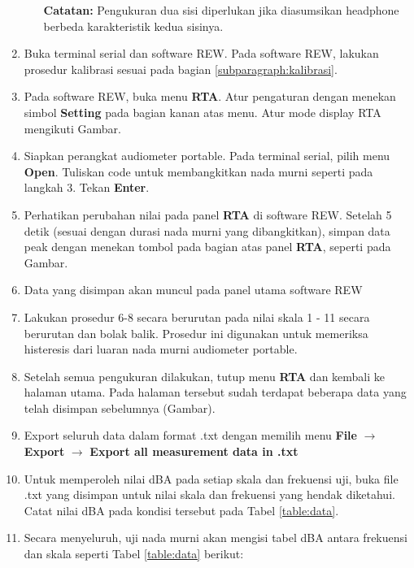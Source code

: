 \documentclass{article}
\begin{document}
\begin{enumerate}
\begin{itemize}
				\textbf{Catatan:} Pengukuran dua sisi diperlukan jika diasumsikan headphone berbeda karakteristik kedua sisinya.
			\end{itemize}

			\item Buka terminal serial dan software REW. Pada software REW, lakukan prosedur kalibrasi sesuai pada bagian \ref{subparagraph:kalibrasi}.

			\item Pada software REW, buka menu {\bf RTA}. Atur pengaturan dengan menekan simbol {\bf Setting} pada bagian kanan atas menu. Atur mode display RTA mengikuti Gambar.

			\item Siapkan perangkat audiometer portable. Pada terminal serial, pilih menu {\bf Open}. Tuliskan code untuk membangkitkan nada murni seperti pada langkah 3. Tekan {\bf Enter}.

			\item Perhatikan perubahan nilai pada panel {\bf RTA} di software REW. Setelah 5 detik (sesuai dengan durasi nada murni yang dibangkitkan), simpan data peak dengan menekan tombol pada bagian atas panel {\bf RTA}, seperti pada Gambar.

			\item Data yang disimpan akan muncul pada panel utama software REW

			\item Lakukan prosedur 6-8 secara berurutan pada nilai skala 1 - 11 secara berurutan dan bolak balik. Prosedur ini digunakan untuk memeriksa histeresis dari luaran nada murni audiometer portable.

			\item Setelah semua pengukuran dilakukan, tutup menu {\bf RTA} dan kembali ke halaman utama. Pada halaman tersebut sudah terdapat beberapa data yang telah disimpan sebelumnya (Gambar).

			\item Export seluruh data dalam format .txt dengan memilih menu {\bf File} $\rightarrow$ {\bf Export}  $\rightarrow$ {\bf Export all measurement data in .txt}

			\item Untuk memperoleh nilai dBA pada setiap skala dan frekuensi uji, buka file .txt yang disimpan untuk nilai skala dan frekuensi yang hendak diketahui. Catat nilai dBA pada kondisi tersebut pada Tabel \ref{table:data}.

			\item Secara menyeluruh, uji nada murni akan mengisi tabel dBA antara frekuensi dan skala seperti Tabel \ref{table:data} berikut:


\end{enumerate}
\end{document}
